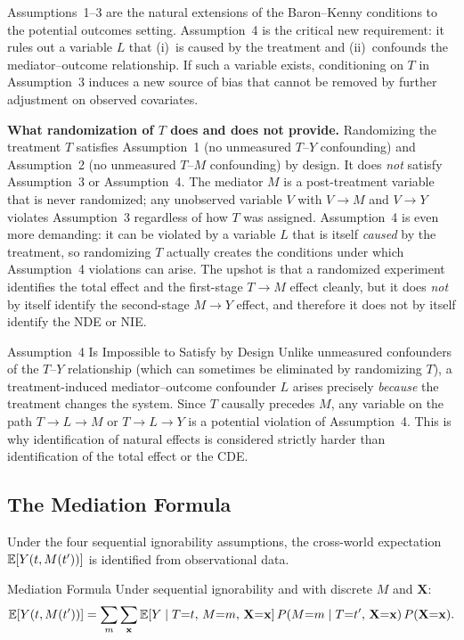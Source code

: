 \documentclass[master.tex]{subfiles}
\begin{document}
\noindent Assumptions~1--3 are the natural extensions of the Baron--Kenny
conditions to the potential outcomes setting.  Assumption~4 is the
critical new requirement: it rules out a variable $L$ that (i)~is
caused by the treatment and (ii)~confounds the mediator--outcome
relationship.  If such a variable exists, conditioning on $T$ in
Assumption~3 induces a new source of bias that cannot be removed by
further adjustment on observed covariates.

\medskip\noindent\textbf{What randomization of $T$ does and does not
provide.}  Randomizing the treatment $T$ satisfies Assumption~1 (no
unmeasured $T$--$Y$ confounding) and Assumption~2 (no unmeasured
$T$--$M$ confounding) by design.  It does \emph{not} satisfy
Assumption~3 or Assumption~4.  The mediator $M$ is a post-treatment
variable that is never randomized; any unobserved variable $V$ with
$V \to M$ and $V \to Y$ violates Assumption~3 regardless of how $T$
was assigned.  Assumption~4 is even more demanding: it can be violated
by a variable $L$ that is itself \emph{caused} by the treatment, so
randomizing $T$ actually creates the conditions under which
Assumption~4 violations can arise.  The upshot is that a randomized
experiment identifies the total effect and the first-stage $T \to M$
effect cleanly, but it does \emph{not} by itself identify the
second-stage $M \to Y$ effect, and therefore it does not by itself
identify the NDE or NIE.

\begin{warn}{Assumption~4 Is Impossible to Satisfy by Design}
Unlike unmeasured confounders of the $T$--$Y$ relationship (which can
sometimes be eliminated by randomizing $T$), a treatment-induced
mediator--outcome confounder $L$ arises precisely \emph{because} the
treatment changes the system.  Since $T$ causally precedes $M$, any
variable on the path $T \to L \to M$ or $T \to L \to Y$ is a
potential violation of Assumption~4.  This is why identification of
natural effects is considered strictly harder than identification of
the total effect or the CDE.
\end{warn}

\subsection{The Mediation Formula}

Under the four sequential ignorability assumptions, the cross-world
expectation $\mathbb{E}[Y(t, M(t'))]$ is identified from observational data.

\begin{thm}{Mediation Formula \citep{pearl2001direct}}
\label{w8:thm:mediation-formula}
Under sequential ignorability and with discrete $M$ and $\mathbf{X}$:
\begin{equation}
  \mathbb{E}\!\left[Y(t, M(t'))\right]
  = \sum_{m}\sum_{\mathbf{x}}
    \mathbb{E}\!\left[Y \mid T{=}t,\, M{=}m,\, \mathbf{X}{=}\mathbf{x}\right]
    P(M{=}m \mid T{=}t',\, \mathbf{X}{=}\mathbf{x})\,
    P(\mathbf{X}{=}\mathbf{x}).
  \label{w8:eq:mediation-formula}
\end{equation}
\end{thm}
\end{document}

